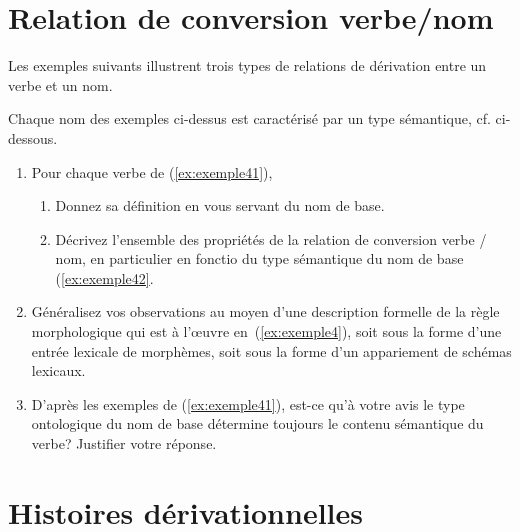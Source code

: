 \section{Relation de conversion verbe/nom}

Les exemples suivants illustrent trois types de relations de dérivation entre un verbe et un nom. 

\begin{exe}
  \ex \label{ex:exemple41}
  \begin{xlist}
    \ex \exquatreazigzaguer  
    \ex \exquatreavitrioler
    \ex \exquatreaventriloquer
  \end{xlist}
\end{exe}

Chaque nom des exemples ci-dessus est caractérisé par un type sémantique, cf. ci-dessous.

\begin{exe}
  \ex \label{ex:exemple42}
  \begin{xlist}
    \ex \exquatrebzigzag
    \ex \exquatrebvitriol
    \ex \label{ex:exemple4} \exquatrebventriloque
  \end{xlist}
\end{exe}

\begin{enumerate}
\item Pour chaque verbe de (\ref{ex:exemple41}), 
  \begin{enumerate}
  \item Donnez sa  définition en vous servant du nom de base.
  \item Décrivez l'ensemble des propriétés de la relation de conversion  verbe / nom, en particulier en fonctio du type sémantique du nom de base (\ref{ex:exemple42}.
  \end{enumerate}   
\item Généralisez vos observations au moyen d'une description formelle de la règle morphologique qui est à l'œuvre en~(\ref{ex:exemple4}), soit sous la forme d'une entrée lexicale de morphèmes, soit sous la forme d'un appariement de schémas lexicaux.
\item D'après les exemples de (\ref{ex:exemple41}), est-ce qu'à votre avis le type ontologique du nom de base détermine toujours le contenu sémantique du verbe? Justifier votre réponse.
\end{enumerate}


\section{Histoires dérivationnelles}


